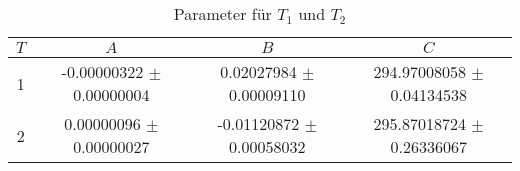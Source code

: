 \begin{table}
        \centering
        \label{tab:parameterabc}
        \begin{tabular}{c c c c}
        \toprule
        $T$ & $A$ & $B$ & $C$ \\
        \midrule
        1 & -0.00000322 $\pm$ 0.00000004 & 0.02027984  $\pm$ 0.00009110 & 294.97008058 $\pm$ 0.04134538 \\
        2 & 0.00000096  $\pm$ 0.00000027 & -0.01120872 $\pm$ 0.00058032 & 295.87018724 $\pm$ 0.26336067 \\
        \bottomrule
        \end{tabular}
        \caption{Parameter für $T_1$ und $T_2$}
        \end{table}